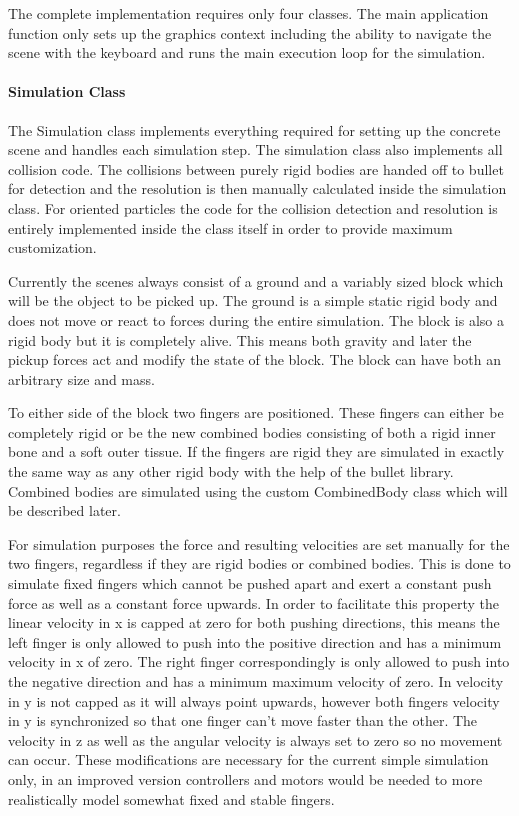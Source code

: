 The complete implementation requires only four classes. The main application function only sets up the graphics context including the ability to navigate the scene with the keyboard and runs the main execution loop for the simulation.

\paragraph{Simulation Class}
The Simulation class implements everything required for setting up the concrete scene and handles each simulation step. The simulation class also implements all collision code. The collisions between purely rigid bodies are handed off to bullet for detection and the resolution is then manually calculated inside the simulation class. For oriented particles the code for the collision detection and resolution is entirely implemented inside the class itself in order to provide maximum customization.

Currently the scenes always consist of a ground and a variably sized block which will be the object to be picked up. The ground is a simple static rigid body and does not move or react to forces during the entire simulation. The block is also a rigid body but it is completely alive. This means both gravity and later the pickup forces act and modify the state of the block. The block can have both an arbitrary size and mass.

To either side of the block two fingers are positioned. These fingers can either be completely rigid or be the new combined bodies consisting of both a rigid inner bone and a soft outer tissue. If the fingers are rigid they are simulated in exactly the same way as any other rigid body with the help of the bullet library. Combined bodies are simulated using the custom CombinedBody class which will be described later.

For simulation purposes the force and resulting velocities are set manually for the two fingers, regardless if they are rigid bodies or combined bodies. This is done to simulate fixed fingers which cannot be pushed apart and exert a constant push force as well as a constant force upwards. In order to facilitate this property the linear velocity in x is capped at zero for both pushing directions, this means the left finger is only allowed to push into the positive direction and has a minimum velocity in x of zero. The right finger correspondingly is only allowed to push into the negative direction and has a minimum maximum velocity of zero. In velocity in y is not capped as it will always point upwards, however both fingers velocity in y is synchronized so that one finger can't move faster than the other. The velocity in z as well as the angular velocity is always set to zero so no movement can occur. These modifications are necessary for the current simple simulation only, in an improved version controllers and motors would be needed to more realistically model somewhat fixed and stable fingers.

